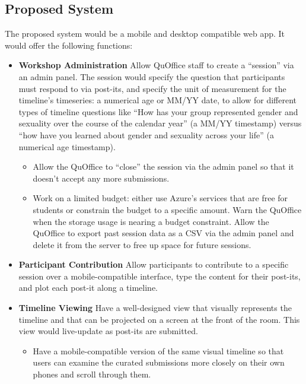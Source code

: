 \documentclass[12pt] {article}
\begin{document}
\subsection{Proposed System}

The proposed system would be a mobile and desktop compatible web app. It would offer the following functions: 
\begin{itemize}
    \item \textbf{Workshop Administration} Allow QuOffice staff to create a “session” via an admin panel. The session would specify the question that participants must respond to via post-its, and specify the unit of measurement for the timeline’s timeseries: a numerical age or MM/YY date, to allow for different types of timeline questions like “How has your group represented gender and sexuality over the course of the calendar year” (a MM/YY timestamp) versus “how have you learned about gender and sexuality across your life” (a numerical age timestamp). 
    \begin{itemize}
        \item Allow the QuOffice to “close” the session via the admin panel so that it doesn’t accept any more submissions. 
        \item Work on a limited budget: either use Azure’s services that are free for students or constrain the budget to a specific amount. Warn the QuOffice when the storage usage is nearing a budget constraint. Allow the QuOffice to export past session data as a CSV via the admin panel and delete it from the server to free up space for future sessions.
    \end{itemize}
    \item \textbf{Participant Contribution} Allow participants to contribute to a specific session over a mobile-compatible interface, type the content for their post-its, and plot each post-it along a timeline.
    \item \textbf{Timeline Viewing }Have a well-designed view that visually represents the timeline and that can be projected on a screen at the front of the room. This view would live-update as post-its are submitted. 
    \begin{itemize}
        \item Have a mobile-compatible version of the same visual timeline so that users can examine the curated submissions more closely on their own phones and scroll through them. 
    \end{itemize}
\end{itemize}
\end{document}
